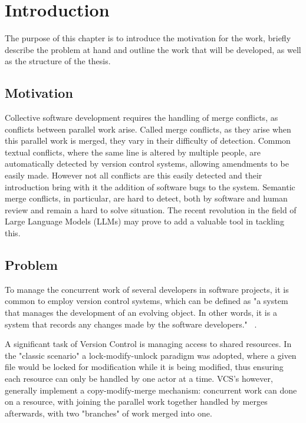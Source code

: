 \chapter{Introduction} \label{chap:intro}

The purpose of this chapter is to introduce the motivation for the work, briefly describe the problem at hand and outline the work that will be developed, as well as the structure of the thesis.

\section{Motivation} \label{sec:motivation}

Collective software development requires the handling of merge conflicts, as conflicts between parallel work arise. Called merge conflicts, as they arise when this parallel work is merged, they vary in their difficulty of detection.
Common textual conflicts, where the same line is altered by multiple people, are automatically detected by version control systems, allowing amendments to be easily made. However not all conflicts are this easily detected and their introduction bring with it the addition of software bugs to the system. Semantic merge conflicts, in particular, are hard to detect, both by software and human review and remain a hard to solve situation.
The recent revolution in the field of Large Language Models (LLMs) may prove to add a valuable tool in tackling this.


\section{Problem} \label{sec:problem}

To manage the concurrent work of several developers in software projects, it is common to employ version control systems, which can be defined as "a system that manages the development of an evolving object. In other words, it is a system that records any changes made by the software developers." ~\citep{kn:vers_review}.

A significant task of Version Control is managing access to shared resources.
In the "classic scenario" a lock-modify-unlock paradigm was adopted, where a given file would be locked for modification while it is being modified, thus ensuring each resource can only be handled by one actor at a time. VCS's however, generally implement a copy-modify-merge mechanism: concurrent work can done on a resource, with joining the parallel work together handled by merges afterwards, with two "branches" of work merged into one. ~\citep{kn:vers_ott}

